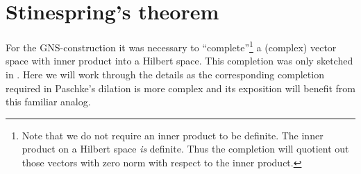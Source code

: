 \documentclass[b]{subfiles}
\begin{document}
\section{Stinespring's theorem}
\begin{parsec}%
\begin{point}%
For the GNS-construction
it was necessary to ``complete''\footnote{Note that
        we do not require an inner product to be definite.
    The inner product on a Hilbert space \emph{is} definite.
    Thus the completion will quotient out those vectors with
        zero norm with respect to the inner product.}
        a (complex) vector space with inner product into a Hilbert space.
This completion was only sketched in .
Here we will work through the details
    as the corresponding completion required
    in Paschke's dilation
    is more complex and its exposition will benefit
    from this familiar analog.
\end{point}


\end{parsec}
\end{document}
